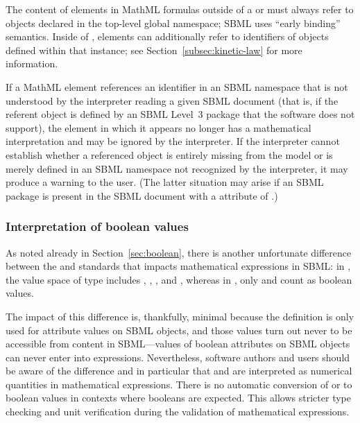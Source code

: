 The content of  elements in MathML formulas outside of a
\KineticLaw or \FunctionDefinition must always refer to objects
declared in the top-level global namespace; \ie SBML uses ``early
binding'' semantics.  Inside of \KineticLaw,  elements
can additionally refer to identifiers of \LocalParameter objects
defined within that \KineticLaw instance; see
Section~\ref{subsec:kinetic-law} for more information.

\begin{blockChanged}

If a MathML  element references an identifier in an SBML namespace that is not understood by the interpreter reading a given SBML document (that is, if the referent object is defined by an SBML Level~3 package that the software does not support), the  element in which it appears no longer has a mathematical interpretation and may be ignored by the interpreter.  If the interpreter cannot establish whether a referenced object is entirely missing from the model or is merely defined in an SBML namespace not recognized by the interpreter, it may produce a warning to the user.  (The latter situation may arise if an SBML package is present in the SBML document with a  attribute of .)

\end{blockChanged}

\subsubsection{Interpretation of boolean values}
\label{sec:handling-booleans}

As noted already in Section~\ref{sec:boolean}, there is another
unfortunate difference between the \xmlschemaone and \mathmltwo
standards that impacts mathematical expressions in SBML: in
\xmlschema, the value space of type  includes
, , , and , whereas in
\mathml, only  and  count as boolean
values.

The impact of this difference is, thankfully, minimal because the
\xmlschema definition is only used for attribute values on SBML
objects, and those values turn out never to be accessible from
\mathml content in SBML---values of boolean attributes on SBML objects
can never enter into \mathml expressions.  Nevertheless, software
authors and users should be aware of the difference and in
particular that  and  are interpreted as numerical
quantities in mathematical expressions.  There is no automatic
conversion of  or  to boolean values in contexts
where booleans are expected.  This allows stricter type checking
and unit verification during the validation of mathematical
expressions.


